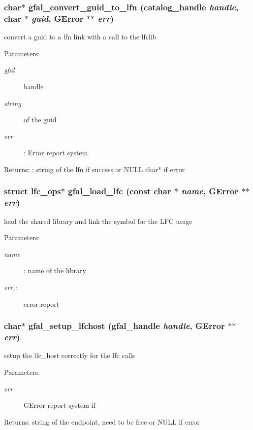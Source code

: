 \subsubsection{\setlength{\rightskip}{0pt plus 5cm}char$\ast$ gfal\_\-convert\_\-guid\_\-to\_\-lfn (catalog\_\-handle {\em handle}, char $\ast$ {\em guid}, GError $\ast$$\ast$ {\em err})}\label{lfc__ifce__ng_8c_c4daecd5aa0938a99eb86c367a0050f1}


convert a guid to a lfn link with a call to the lfclib \begin{Desc}
\item[Parameters:]
\begin{description}
\item[{\em gfal}]handle \item[{\em string}]of the guid \item[{\em err}]: Error report system \end{description}
\end{Desc}
\begin{Desc}
\item[Returns:]: string of the lfn if success or NULL char$\ast$ if error \end{Desc}
\subsubsection{\setlength{\rightskip}{0pt plus 5cm}struct lfc\_\-ops$\ast$ gfal\_\-load\_\-lfc (const char $\ast$ {\em name}, GError $\ast$$\ast$ {\em err})}\label{lfc__ifce__ng_8c_7c91643749a2c5d7e8043c0e42d00fd6}


load the shared library and link the symbol for the LFC usage \begin{Desc}
\item[Parameters:]
\begin{description}
\item[{\em name}]: name of the library \item[{\em err,:}]error report \end{description}
\end{Desc}
\subsubsection{\setlength{\rightskip}{0pt plus 5cm}char$\ast$ gfal\_\-setup\_\-lfchost (gfal\_\-handle {\em handle}, GError $\ast$$\ast$ {\em err})}\label{lfc__ifce__ng_8c_5d13dc09e91f66d74de768c2e4bf4872}


setup the lfc\_\-host correctly for the lfc calls \begin{Desc}
\item[Parameters:]
\begin{description}
\item[{\em err}]GError report system if \end{description}
\end{Desc}
\begin{Desc}
\item[Returns:]string of the endpoint, need to be free or NULL if error \end{Desc}
